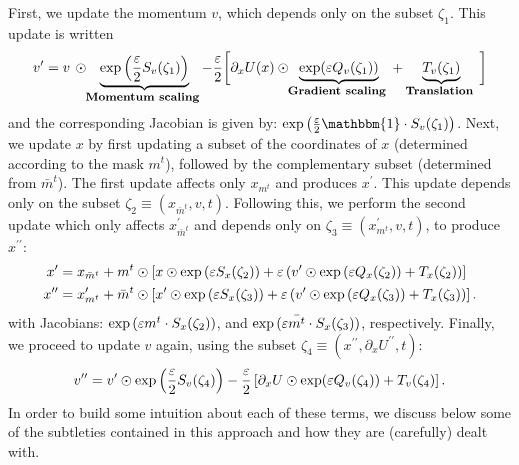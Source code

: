 First, we update the momentum $v$, which depends only on the subset $\zeta_1$.
%
This update is written
%
\begin{equation}
\label{eq:update_momentum_forward1}
  \vp = v\, \odot
      \hspace{-1mm}
      \underbrace{\exp\left(\frac{\varepsilon}{2}S_{v}(\zeta_1)\right)}_{\text{%
      \footnotesize{\textbf{Momentum scaling}\normalsize}
       }}%
      \hspace{-1mm}
       - \frac{\varepsilon}{2}\bigg[\partial_{x}U(x)\odot
      \hspace{-1mm}
      \underbrace{\exp(\varepsilon Q_{v}(\zeta_1))}_{\text{%
       \footnotesize{\textbf{Gradient scaling}\normalsize}
        }}
       + \underbrace{T_v(\zeta_1)}_{\text{%
       \footnotesize{\textbf{Translation}\normalsize}
       }}\bigg]
\end{equation}
and the corresponding Jacobian is given by:
$\exp{\left(\frac{\eps}{2}\mathbbm{1} \cdot S_{v}(\zeta_1)\right)}$.
%
Next, we update $x$ by first updating a subset of the coordinates of $x$
(determined according to the mask $m^t$), followed by the complementary subset
(determined from $\bar m^{t}$).
%
The first update affects only $x_{m^{t}}$ and produces $x^{\prime}$.
%
This update depends only on the subset $\zeta_2 \equiv (x_{\bar m^t}, v, t)$.
%
Following this, we perform the second update which only affects
$x_{\bar{m}^t}^{\prime}$ and depends only on $\zeta_3 \equiv (x_{m^t}^{\prime},
v, t)$, to produce $x^{\prime\prime}$:
%
\begin{align}
  x^{\prime} &= x_{\bar{m}^t} + m^{t}\odot\left[x \odot \exp{(\eps
      S_x(\zeta_2))} + \eps\left(v^{\prime}\odot%
    \exp{(\eps Q_x(\zeta_2))} + T_x(\zeta_2)\right)\right]\\
  x^{\prime\prime} &= x^{\prime}_{m^t} + \bar m^t \odot \left[x^{\prime} \odot
    \exp{(\eps S_x(\zeta_3))} +%
    \eps\left(v^{\prime} \odot \exp{(\eps Q_x(\zeta_3))} +
  T_x(\zeta_3)\right)\right].
\end{align}
%
with Jacobians: $\exp{({\varepsilon}m^{t} \cdot S_x(\zeta_2))}$, and
$\exp{({\varepsilon}\bar{m^t}\cdot S_x(\zeta_3))}$, respectively. 
%
Finally, we proceed to update $v$ again, using the subset $\zeta_4 \equiv
(x^{\prime\prime}, \partial_{x} U^{\prime\prime}, t)$: 
%
\begin{equation} 
  {v^{\prime\prime}} = {v^{\prime}} \odot \exp\left(\frac{\varepsilon}{2} S_v(\zeta_4)\right) -
    \frac{\varepsilon}{2}\left[\partial_{x} U
  \odot \exp(\varepsilon Q_v(\zeta_4)) + T_v(\zeta_4)\right].
    \label{eq:update_momentum_forward2}
\end{equation}
%
In order to build some intuition about each of these terms, we discuss below
some of the subtleties contained in this approach and how they are (carefully)
dealt with.

